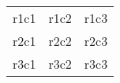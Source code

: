 \documentclass{article}
\begin{document}
\begin{tabular}{ c c c }
  r1c1 & r1c2 & r1c3 \\
  r2c1 & r2c2 & r2c3 \\
  r3c1 & r3c2 & r3c3
\end{tabular}
\end{document}
